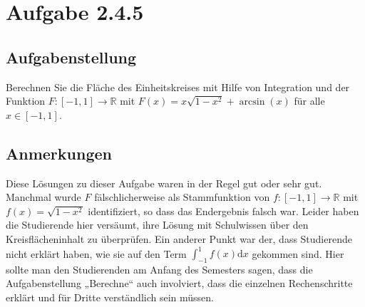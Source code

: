 \documentclass[a4paper]{article}
\newcommand*{\R}{\mathbb R}
\begin{document}
\section{Aufgabe 2.4.5}

\subsection{Aufgabenstellung}

Berechnen Sie die Fläche des Einheitskreises mit Hilfe von Integration und der Funktion $F:[-1,1]\to\R$ mit $F(x)=x\sqrt{1-x^2}+\operatorname{arcsin}(x)$ für alle $x\in[-1,1]$.

\subsection{Anmerkungen}

Diese Lösungen zu dieser Aufgabe waren in der Regel gut oder sehr gut. Manchmal wurde $F$ fälschlicherweise als Stammfunktion von $f:[-1,1]\to\R$ mit $f(x)=\sqrt{1-x^2}$ identifiziert, so dass das Endergebnis falsch war. Leider haben die Studierende hier versäumt, ihre Lösung mit Schulwissen über den Kreisflächeninhalt zu überprüfen. Ein anderer Punkt war der, dass Studierende nicht erklärt haben, wie sie auf den Term $\int_{-1}^1 f(x) \mathrm dx$ gekommen sind. Hier sollte man den Studierenden am Anfang des Semesters sagen, dass die Aufgabenstellung „Berechne“ auch involviert, dass die einzelnen Rechenschritte erklärt und für Dritte verständlich sein müssen.
\end{document}
